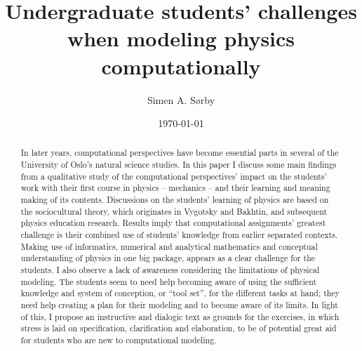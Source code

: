 \documentclass[aps,prb,floatfix,twocolumn,twoside,english]{revtex4-1}
\begin{document}
\title{Undergraduate students' challenges when modeling physics computationally}

\author{Simen A. S{\o}rby}






\date{\today}


\begin{abstract}

In later years, computational perspectives have become essential parts in several of the University of Oslo's natural science studies. In this paper I discuss some main findings from a qualitative study of the computational perspectives' impact on the students' work with their first course in physics -- mechanics -- and their learning and meaning making of its contents. Discussions on the students' learning of physics are based on the sociocultural theory, which originates in Vygotsky and Bakhtin, and subsequent physics education research. Results imply that computational assignments' greatest challenge is their combined use of students' knowledge from earlier separated contexts. Making use of informatics, numerical and analytical mathematics and conceptual understanding of physics in one big package, appears as a clear challenge for the students. I also observe a lack of awareness considering the limitations of physical modeling. The students seem to need help becoming aware of using the sufficient knowledge and system of conception, or ``tool set'', for the different tasks at hand; they need help creating a plan for their modeling and to become aware of its limits. In light of this, I propose an instructive and dialogic text as grounds for the exercises, in which stress is laid on specification, clarification and elaboration, to be of potential great aid for students who are new to computational modeling.

\end{abstract}

\maketitle
\end{document}
